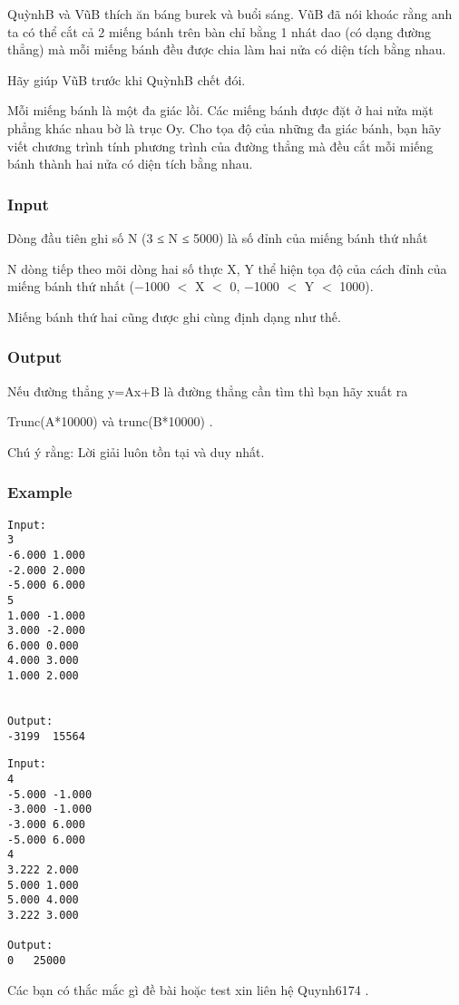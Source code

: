 



   QuỳnhB và VũB thích ăn báng burek và buổi sáng. VũB đã nói khoác rằng anh ta có thể cắt cả 2 miếng bánh trên bàn chỉ bằng 1 nhát dao (có dạng đường thẳng) mà mỗi miếng bánh đều được chia làm hai nửa có diện tích bằng nhau.  

   Hãy giúp VũB trước khi QuỳnhB chết đói.  





   Mỗi miếng bánh là một đa giác lồi. Các miếng bánh được đặt ở hai nửa mặt phẳng khác nhau bờ là trục Oy. Cho tọa độ của những đa giác bánh, bạn hãy viết chương trình tính phương trình của đường thẳng mà đều cắt mỗi miếng bánh thành hai nửa có diện tích bằng nhau.  

\subsubsection{   Input  }

   Dòng đầu tiên ghi số N (3 ≤ N ≤ 5000) là số đỉnh của miếng bánh thứ nhất  

   N dòng tiếp theo mõi dòng hai số thực X, Y thể hiện tọa độ của cách đỉnh của miếng bánh thứ nhất (−1000 $<$ X $<$ 0, −1000 $<$ Y $<$ 1000).  

   Miếng bánh thứ hai cũng được ghi cùng định dạng như thế.  

\subsubsection{   Output  }

   Nếu đường thẳng y=Ax+B là đường thẳng cần tìm thì bạn hãy xuất ra  

   Trunc(A*10000) và trunc(B*10000) .  

       Chú ý rằng: Lời giải luôn tồn tại và duy nhất.     

\subsubsection{   Example  }
\begin{verbatim}
Input:
3
-6.000 1.000
-2.000 2.000
-5.000 6.000
5
1.000 -1.000
3.000 -2.000
6.000 0.000
4.000 3.000
1.000 2.000


Output:
-3199  15564
\end{verbatim}
\begin{verbatim}
Input:
4
-5.000 -1.000
-3.000 -1.000
-3.000 6.000
-5.000 6.000
4
3.222 2.000
5.000 1.000
5.000 4.000
3.222 3.000

Output:
0   25000
\end{verbatim}

       Các bạn có thắc mắc gì đề bài hoặc test xin liên hệ Quynh6174 .     